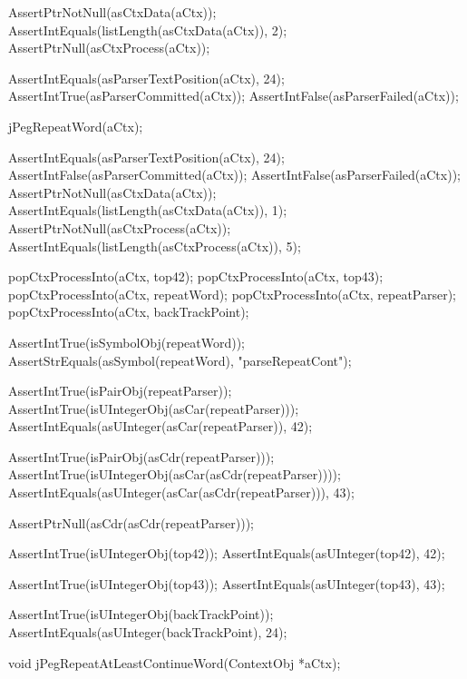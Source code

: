   AssertPtrNotNull(asCtxData(aCtx));
  AssertIntEquals(listLength(asCtxData(aCtx)), 2);
  AssertPtrNull(asCtxProcess(aCtx));
  
  AssertIntEquals(asParserTextPosition(aCtx), 24);
  AssertIntTrue(asParserCommitted(aCtx));
  AssertIntFalse(asParserFailed(aCtx));
  
  jPegRepeatWord(aCtx);
  
  AssertIntEquals(asParserTextPosition(aCtx), 24);
  AssertIntFalse(asParserCommitted(aCtx));
  AssertIntFalse(asParserFailed(aCtx));
  AssertPtrNotNull(asCtxData(aCtx));
  AssertIntEquals(listLength(asCtxData(aCtx)), 1);
  AssertPtrNotNull(asCtxProcess(aCtx));
  AssertIntEquals(listLength(asCtxProcess(aCtx)), 5);
    
  popCtxProcessInto(aCtx, top42);
  popCtxProcessInto(aCtx, top43);
  popCtxProcessInto(aCtx, repeatWord);
  popCtxProcessInto(aCtx, repeatParser);
  popCtxProcessInto(aCtx, backTrackPoint);
  
  AssertIntTrue(isSymbolObj(repeatWord));
  AssertStrEquals(asSymbol(repeatWord), "parseRepeatCont");
  
  AssertIntTrue(isPairObj(repeatParser));
  AssertIntTrue(isUIntegerObj(asCar(repeatParser)));
  AssertIntEquals(asUInteger(asCar(repeatParser)), 42);
  
  AssertIntTrue(isPairObj(asCdr(repeatParser)));
  AssertIntTrue(isUIntegerObj(asCar(asCdr(repeatParser))));
  AssertIntEquals(asUInteger(asCar(asCdr(repeatParser))), 43);
  
  AssertPtrNull(asCdr(asCdr(repeatParser)));
  
  AssertIntTrue(isUIntegerObj(top42));
  AssertIntEquals(asUInteger(top42), 42);  

  AssertIntTrue(isUIntegerObj(top43));
  AssertIntEquals(asUInteger(top43), 43);
  
  AssertIntTrue(isUIntegerObj(backTrackPoint));
  AssertIntEquals(asUInteger(backTrackPoint), 24);
\stopCTest
\stopTestCase
\stopTestSuite

\startTestSuite[jPegRepeatAtLeastContinueWord]

\startCHeader
void jPegRepeatAtLeastContinueWord(ContextObj *aCtx);
\stopCHeader

